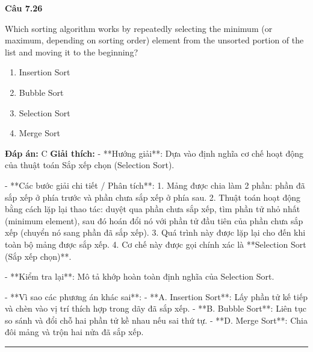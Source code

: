 \documentclass[11pt,a4paper]{article}
\newenvironment{question}[1]{%
  \par\vspace{1em}\noindent\textbf{\large Câu #1}\par\vspace{0.4em}
}{%
  \par\vspace{1em}\hrule\vspace{0.6em}
}
\newenvironment{choices}{%
  \begin{enumerate}[label=\textbf{\Alph*.},leftmargin=2.2em,itemsep=2pt,topsep=3pt]
}{%
  \end{enumerate}
}
\newcommand{\choice}{\item}
\begin{document}
\begin{question}{7.26}
Which sorting algorithm works by repeatedly selecting the minimum (or maximum, depending on sorting order) element from the unsorted portion of the list and moving it to the beginning?
\begin{choices}
\choice Insertion Sort
\choice Bubble Sort
\choice Selection Sort
\choice Merge Sort
\end{choices}
\textbf{Đáp án:} C
\textbf{Giải thích:} - **Hướng giải**:
  Dựa vào định nghĩa cơ chế hoạt động của thuật toán Sắp xếp chọn (Selection Sort).

- **Các bước giải chi tiết / Phân tích**:
  1. Mảng được chia làm 2 phần: phần đã sắp xếp ở phía trước và phần chưa sắp xếp ở phía sau.
  2. Thuật toán hoạt động bằng cách lặp lại thao tác: duyệt qua phần chưa sắp xếp, tìm phần tử nhỏ nhất (minimum element), sau đó hoán đổi nó với phần tử đầu tiên của phần chưa sắp xếp (chuyển nó sang phần đã sắp xếp).
  3. Quá trình này được lặp lại cho đến khi toàn bộ mảng được sắp xếp.
  4. Cơ chế này được gọi chính xác là **Selection Sort (Sắp xếp chọn)**.

- **Kiểm tra lại**:
  Mô tả khớp hoàn toàn định nghĩa của Selection Sort.

- **Vì sao các phương án khác sai**:
  - **A. Insertion Sort**: Lấy phần tử kế tiếp và chèn vào vị trí thích hợp trong dãy đã sắp xếp.
  - **B. Bubble Sort**: Liên tục so sánh và đổi chỗ hai phần tử kề nhau nếu sai thứ tự.
  - **D. Merge Sort**: Chia đôi mảng và trộn hai nửa đã sắp xếp.
\end{question}
\end{document}
